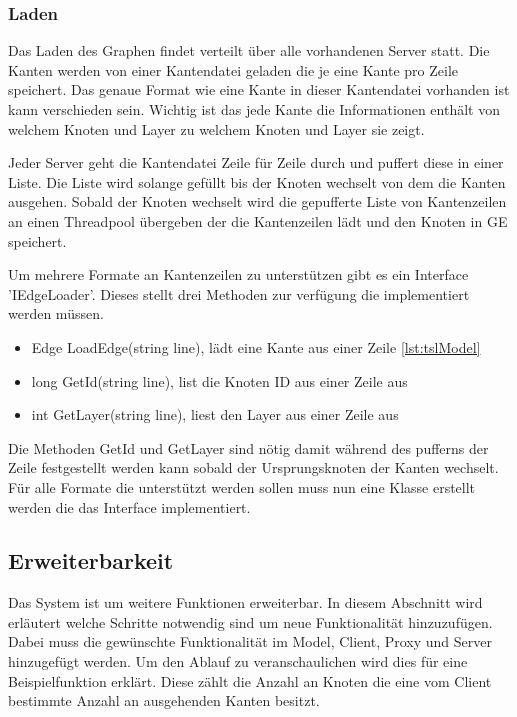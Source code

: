 \subsubsection{Laden}

Das Laden des Graphen findet verteilt über alle vorhandenen Server statt. Die Kanten werden von einer Kantendatei geladen die je eine Kante pro Zeile speichert. Das genaue Format wie eine Kante in dieser Kantendatei vorhanden ist kann verschieden sein. Wichtig ist das jede Kante die Informationen enthält von welchem Knoten und Layer zu welchem Knoten und Layer sie zeigt.

Jeder Server geht die Kantendatei Zeile für Zeile durch und puffert diese in einer Liste. Die Liste wird solange gefüllt bis der Knoten wechselt von dem die Kanten ausgehen. Sobald der Knoten wechselt wird die gepufferte Liste von Kantenzeilen an einen Threadpool übergeben der die Kantenzeilen lädt und den Knoten in GE speichert.

Um mehrere Formate an Kantenzeilen zu unterstützen gibt es ein Interface 'IEdgeLoader'. Dieses stellt drei Methoden zur verfügung die implementiert werden müssen.

\begin{itemize}
  \item Edge LoadEdge(string line), lädt eine Kante aus einer Zeile \ref{lst:tslModel}
  \item long GetId(string line), list die Knoten ID aus einer Zeile aus
  \item int GetLayer(string line), liest den Layer aus einer Zeile aus
\end{itemize}

Die Methoden GetId und GetLayer sind nötig damit während des pufferns der Zeile festgestellt werden kann sobald der Ursprungsknoten der Kanten wechselt.
Für alle Formate die unterstützt werden sollen muss nun eine Klasse erstellt werden die das Interface implementiert.



\subsection{Erweiterbarkeit}

Das System ist um weitere Funktionen erweiterbar. In diesem Abschnitt wird erläutert welche Schritte notwendig sind um neue Funktionalität hinzuzufügen.
Dabei muss die gewünschte Funktionalität im Model, Client, Proxy und Server hinzugefügt werden. Um den Ablauf zu veranschaulichen wird dies für eine Beispielfunktion erklärt. Diese zählt die Anzahl an Knoten die eine vom Client bestimmte Anzahl an ausgehenden Kanten besitzt.

